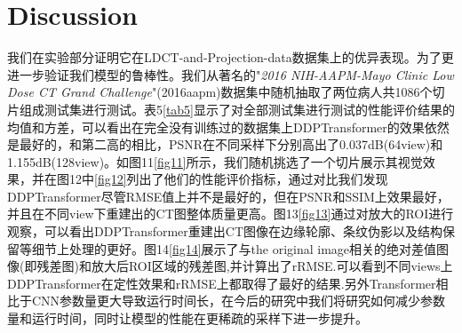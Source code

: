 \section{Discussion}
我们在实验部分证明它在LDCT-and-Projection-data数据集上的优异表现。为了更进一步验证我们模型的鲁棒性。我们从著名的"\emph{2016 NIH-AAPM-Mayo Clinic Low Dose CT Grand Challenge}"(2016aapm)\cite{mccollough2016tu}数据集中随机抽取了两位病人共1086个切片组成测试集进行测试。表5\ref{tab5}显示了对全部测试集进行测试的性能评价结果的均值和方差，可以看出在完全没有训练过的数据集上DDPTransformer的效果依然是最好的，和第二高的相比，PSNR在不同采样下分别高出了0.037dB(64view)和1.155dB(128view)。如图11\ref{fig11}所示，我们随机挑选了一个切片展示其视觉效果，并在图12中\ref{fig12}列出了他们的性能评价指标，通过对比我们发现DDPTransformer尽管RMSE值上并不是最好的，但在PSNR和SSIM上效果最好，并且在不同view下重建出的CT图整体质量更高。图13\ref{fig13}通过对放大的ROI进行观察，可以看出DDPTransformer重建出CT图像在边缘轮廓、条纹伪影以及结构保留等细节上处理的更好。图14\ref{fig14}展示了与the original image相关的绝对差值图像(即残差图)和放大后ROI区域的残差图,并计算出了rRMSE.可以看到不同views上DDPTransformer在定性效果和rRMSE上都取得了最好的结果.另外Transformer相比于CNN参数量更大导致运行时间长，在今后的研究中我们将研究如何减少参数量和运行时间，同时让模型的性能在更稀疏的采样下进一步提升。\par
